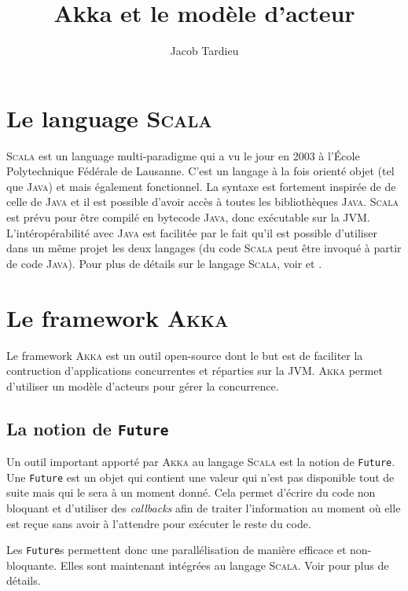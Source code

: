 \documentclass[11pt,a4paper]{article}
\title{Akka et le modèle d'acteur}
\author{Jacob Tardieu}
\begin{document}
\maketitle

\section{Le language \textsc{Scala}}
\textsc{Scala} \cite{scala:website} est un language multi-paradigme qui a vu le jour en 2003 à l'École Polytechnique Fédérale de Lausanne. C'est un langage à la fois orienté objet (tel que \textsc{Java}) et mais également fonctionnel. La syntaxe est fortement inspirée de de celle de \textsc{Java} et il est possible d'avoir accès à toutes les bibliothèques \textsc{Java}. \textsc{Scala} est prévu pour être compilé en bytecode \textsc{Java}, donc exécutable sur la JVM. L'intéropérabilité avec \textsc{Java} est facilitée par le fait qu'il est possible d'utiliser dans un même projet les deux langages (du code \textsc{Scala} peut être invoqué à partir de code \textsc{Java}).
Pour plus de détails sur le langage \textsc{Scala}, voir \cite{wiki:scala} et \cite{scala:website}.

\section{Le framework \textsc{Akka}}
Le framework \textsc{Akka} \cite{akka:website} est un outil open-source dont le but est de faciliter la contruction d'applications concurrentes et réparties sur la JVM. \textsc{Akka} permet d'utiliser un modèle d'acteurs pour gérer la concurrence.

\subsection{La notion de \texttt{Future}}
Un outil important apporté par \textsc{Akka} au langage \textsc{Scala} est la notion de \texttt{Future}. Une \texttt{Future} est un objet qui contient une valeur qui n'est pas disponible tout de suite mais qui le sera à un moment donné.
Cela permet d'écrire du code non bloquant et d'utiliser des \textit{callbacks} afin de traiter l'information au moment où elle est reçue sans avoir à l'attendre pour exécuter le reste du code.

Les \texttt{Future}s permettent donc une parallélisation de manière efficace et non-bloquante. Elles sont maintenant intégrées au langage \textsc{Scala}. Voir \cite{scala:futures} pour plus de détails.
\end{document}
